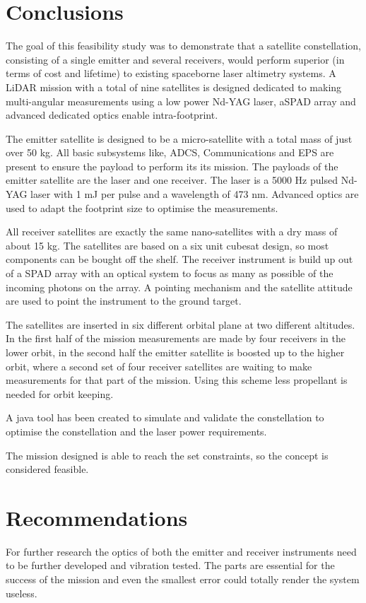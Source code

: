 \section{Conclusions}
\label{frCRconclusions}
The goal of this feasibility study was to demonstrate that a satellite constellation, consisting of a single emitter and several receivers, would perform
superior (in terms of cost and lifetime) to existing spaceborne laser altimetry systems. A \ac{LiDAR} mission with a total of nine satellites is designed dedicated to making multi-angular measurements using a low power \ac{Nd-YAG} \ac{laser}, a\ac{SPAD} array and advanced dedicated optics enable intra-footprint. 

The emitter satellite is designed to be a micro-satellite with a total mass of just over 50 kg. All basic subsystems like, \ac{ADCS}, Communications and \ac{EPS} are present to ensure the payload to perform its its mission. The payloads of the emitter satellite are the \ac{laser} and one receiver. The \ac{laser} is a 5000 Hz pulsed \ac{Nd-YAG} \ac{laser} with 1 mJ per pulse and a wavelength of 473 nm. Advanced optics are used to adapt the footprint size to optimise the measurements.

All receiver satellites are exactly the same nano-satellites with a dry mass of about 15 kg. The satellites are based on a six unit cubesat design, so most components can be bought off the shelf. The receiver instrument is build up out of a \ac{SPAD} array with an optical system to focus as many as possible of the incoming photons on the array. A pointing mechanism and the satellite attitude are used to point the instrument to the ground target.

The satellites are inserted in six different orbital plane at two different altitudes. In the first half of the mission measurements are made by four receivers in the lower orbit, in the second half the emitter satellite is boosted up to the higher orbit, where a second set of four receiver satellites are waiting to make measurements for that part of the mission. Using this scheme less propellant is needed for orbit keeping.

A java tool has been created to simulate and validate the constellation to optimise the constellation and the laser power requirements.

The mission designed is able to reach the set constraints, so the concept is considered feasible.

\section{Recommendations}
\label{frCRrecommendations}
For further research the optics of both the emitter and receiver instruments need to be further developed and vibration tested. The parts are essential for the success of the mission and even the smallest error could totally render the system useless.

